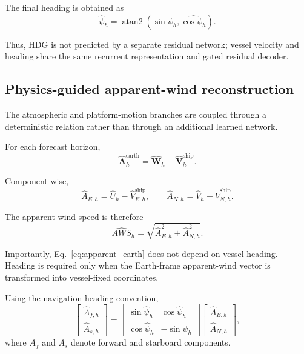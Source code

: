 The final heading is obtained as
\begin{equation}
\hat\psi_h
=
\operatorname{atan2}
\left(
\widehat{\sin\psi_h},
\widehat{\cos\psi_h}
\right).
\label{eq:heading_angle}
\end{equation}

Thus, HDG is not predicted by a separate residual network; vessel velocity and heading share the same recurrent representation and gated residual decoder.

\subsection{Physics-guided apparent-wind reconstruction}
\label{subsec:apparent_reconstruction}

The atmospheric and platform-motion branches are coupled through a deterministic relation rather than through an additional learned network.

For each forecast horizon,
\begin{equation}
\hat{\mathbf A}_{h}^{\mathrm{earth}}
=
\hat{\mathbf W}_{h}
-
\hat{\mathbf V}_{h}^{\mathrm{ship}}.
\label{eq:apparent_earth}
\end{equation}

Component-wise,
\begin{equation}
\hat A_{E,h}
=
\hat U_h
-
\hat V^{\mathrm{ship}}_{E,h},
\qquad
\hat A_{N,h}
=
\hat V_h
-
\hat V^{\mathrm{ship}}_{N,h}.
\label{eq:apparent_components}
\end{equation}

The apparent-wind speed is therefore
\begin{equation}
\widehat{AWS}_h
=
\sqrt{
\hat A_{E,h}^{2}
+
\hat A_{N,h}^{2}
}.
\label{eq:aws}
\end{equation}

Importantly, Eq.~\eqref{eq:apparent_earth} does not depend on vessel heading. Heading is required only when the Earth-frame apparent-wind vector is transformed into vessel-fixed coordinates.

Using the navigation heading convention,
\begin{equation}
\begin{bmatrix}
\hat A_{f,h}\\
\hat A_{s,h}
\end{bmatrix}
=
\begin{bmatrix}
\sin\hat\psi_h & \cos\hat\psi_h\\
\cos\hat\psi_h & -\sin\hat\psi_h
\end{bmatrix}
\begin{bmatrix}
\hat A_{E,h}\\
\hat A_{N,h}
\end{bmatrix},
\label{eq:body_rotation}
\end{equation}
where $A_f$ and $A_s$ denote forward and starboard components.

